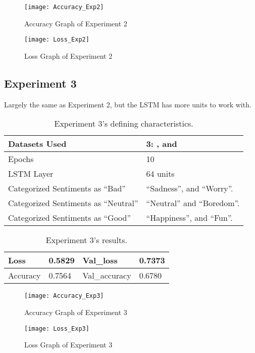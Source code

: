 \begin{figure}[!h]
	\centering
	\texttt{[image: Accuracy\_Exp2]}
	\caption{Accuracy Graph of Experiment 2}
	\label{fig:accuracy_exp2}
	\texttt{[image: Loss\_Exp2]}
	\caption{Loss Graph of Experiment 2}
	\label{fig:loss_exp2}
\end{figure}
\pagebreak

\subsection{Experiment 3}
Largely the same as Experiment 2, but the LSTM has more units to work with.
\begin{table}[!th]
	\caption{Experiment 3's defining characteristics.}
	\vspace{0.5cm}
	\centering
	\begin{tabular}[t]{|l|l|}
	\hline
		Datasets Used & \makecell{3: \citet{d1}, \citet{d2} and\\ \citet{d3}}
	\\ \hline
		Epochs & 10
	\\ \hline
		LSTM Layer & 64 units
	\\ \hline
		Categorized Sentiments as ``Bad'' & ``Sadness'', and ``Worry''.
	\\ \hline	
		 Categorized Sentiments as ``Neutral'' & ``Neutral'' and ``Boredom''.
	\\ \hline	
		Categorized Sentiments as ``Good'' & ``Happiness'', and ``Fun''.
	\\ \hline
	\end{tabular}
\end{table}

\begin{table}[!bh]
	\caption{Experiment 3's results.}
	\vspace{0.5cm}
	\centering
	\begin{tabular}[t]{|l|l|l|l|}
	\hline
		Loss & 0.5829 & Val\_loss & 0.7373
	\\ \hline
		Accuracy & 0.7564 & Val\_accuracy & 0.6780
	\\ \hline
	\end{tabular}
\end{table}


\begin{figure}[!h]
	\centering
	\texttt{[image: Accuracy\_Exp3]}
	\caption{Accuracy Graph of Experiment 3}
	\label{fig:accuracy_exp3}
	\texttt{[image: Loss\_Exp3]}
	\caption{Loss Graph of Experiment 3}
	\label{fig:loss_exp3}
\end{figure}
\pagebreak


